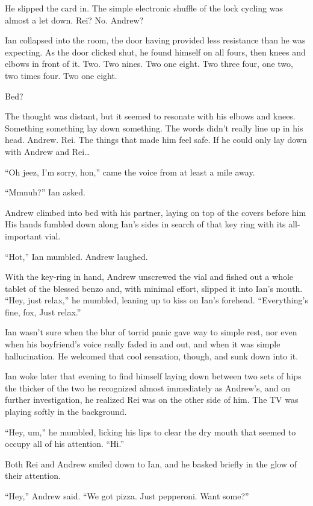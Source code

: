 He slipped the card in. The simple electronic shuffle of the lock cycling was almost a let down. Rei? No. Andrew?

Ian collapsed into the room, the door having provided less resistance than he was expecting. As the door clicked shut, he found himself on all fours, then knees and elbows in front of it. Two. Two nines. Two one eight. Two three four, one two, two times four. Two one eight.

Bed?

The thought was distant, but it seemed to resonate with his elbows and knees. Something something lay down something. The words didn't really line up in his head. Andrew. Rei. The things that made him feel safe. If he could only lay down with Andrew and Rei\ldots{}

\secdiv

``Oh jeez, I'm sorry, hon,'' came the voice from at least a mile away.

``Mmnuh?'' Ian asked.

Andrew climbed into bed with his partner, laying on top of the covers before him His hands fumbled down along Ian's sides in search of that key ring with its all-important vial.

``Hot,'' Ian mumbled. Andrew laughed.

With the key-ring in hand, Andrew unscrewed the vial and fished out a whole tablet of the blessed benzo and, with minimal effort, slipped it into Ian's mouth. ``Hey, just relax,'' he mumbled, leaning up to kiss on Ian's forehead. ``Everything's fine, fox, Just relax.''

Ian wasn't sure when the blur of torrid panic gave way to simple rest, nor even when his boyfriend's voice really faded in and out, and when it was simple hallucination. He welcomed that cool sensation, though, and sunk down into it.

\secdiv

Ian woke later that evening to find himself laying down between two sets of hips the thicker of the two he recognized almost immediately as Andrew's, and on further investigation, he realized Rei was on the other side of him. The TV was playing softly in the background.

``Hey, um,'' he mumbled, licking his lips to clear the dry mouth that seemed to occupy all of his attention. ``Hi.''

Both Rei and Andrew smiled down to Ian, and he basked briefly in the glow of their attention.

``Hey,'' Andrew said. ``We got pizza. Just pepperoni. Want some?''

